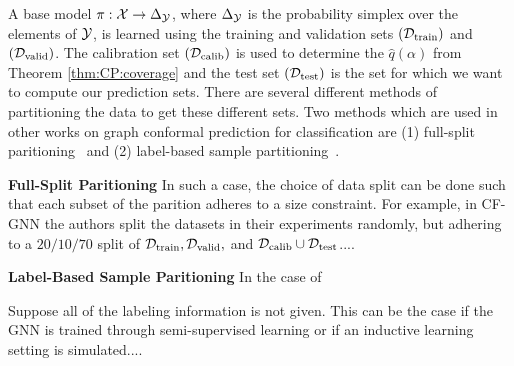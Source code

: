 
 A base model $\pi: {\mathcal{X}} \to \Delta_{{\mathcal{Y}}}$, where $\Delta_{{\mathcal{Y}}}$ is the probability simplex over the elements of ${\mathcal{Y}}$, is learned using the training and validation sets $({\mathcal{D}}_{\text{train}})$ and $({\mathcal{D}}_{\text{valid}})$. The calibration set $({\mathcal{D}}_{\text{calib}})$ is used to determine the $\hat{q}(\alpha)$ from Theorem \ref{thm:CP:coverage} and the test set $({\mathcal{D}}_{\text{test}})$ is the set for which we want to compute our prediction sets.
There are several different methods of partitioning the data to get these different sets. Two methods which are used in other works on graph conformal prediction for classification are (1) full-split paritioning~\cite{huang2024uncertainty} and (2) label-based sample partitioning~\cite{zargarbashi23conformal}.
 
\noindent \textbf{Full-Split Paritioning}
In such a case, the choice of data split can be done such that each subset of the parition adheres to a size constraint. For example, in CF-GNN \cite{huang2024uncertainty} the authors split the datasets in their experiments randomly, but adhering to a $20/10/70$ split of ${\mathcal{D}}_{\text{train}}, {\mathcal{D}}_{\text{valid}},$ and ${\mathcal{D}}_{\text{calib}}\cup {\mathcal{D}}_{\text{test}}$....

\noindent \textbf{Label-Based Sample Paritioning}
In the case of 

Suppose all of the labeling information is not given. This can be the case if the GNN is trained through semi-supervised learning or if an inductive learning setting is simulated....
